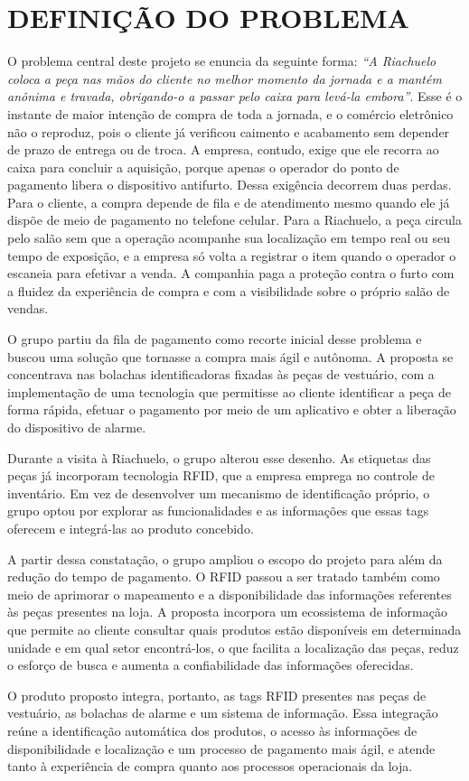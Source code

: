 
\section{DEFINIÇÃO DO PROBLEMA}
\label{sec:def_problema}

O problema central deste projeto se enuncia da seguinte forma: \emph{``A Riachuelo coloca a peça nas mãos do cliente no melhor momento da jornada e a mantém anônima e travada, obrigando-o a passar pelo caixa para levá-la embora''}. Esse é o instante de maior intenção de compra de toda a jornada, e o comércio eletrônico não o reproduz, pois o cliente já verificou caimento e acabamento sem depender de prazo de entrega ou de troca. A empresa, contudo, exige que ele recorra ao caixa para concluir a aquisição, porque apenas o operador do ponto de pagamento libera o dispositivo antifurto. Dessa exigência decorrem duas perdas. Para o cliente, a compra depende de fila e de atendimento mesmo quando ele já dispõe de meio de pagamento no telefone celular. Para a Riachuelo, a peça circula pelo salão sem que a operação acompanhe sua localização em tempo real ou seu tempo de exposição, e a empresa só volta a registrar o item quando o operador o escaneia para efetivar a venda. A companhia paga a proteção contra o furto com a fluidez da experiência de compra e com a visibilidade sobre o próprio salão de vendas.

O grupo partiu da fila de pagamento como recorte inicial desse problema e buscou uma solução que tornasse a compra mais ágil e autônoma. A proposta se concentrava nas bolachas identificadoras fixadas às peças de vestuário, com a implementação de uma tecnologia que permitisse ao cliente identificar a peça de forma rápida, efetuar o pagamento por meio de um aplicativo e obter a liberação do dispositivo de alarme.

Durante a visita à Riachuelo, o grupo alterou esse desenho. As etiquetas das peças já incorporam tecnologia RFID, que a empresa emprega no controle de inventário. Em vez de desenvolver um mecanismo de identificação próprio, o grupo optou por explorar as funcionalidades e as informações que essas tags oferecem e integrá-las ao produto concebido.

A partir dessa constatação, o grupo ampliou o escopo do projeto para além da redução do tempo de pagamento. O RFID passou a ser tratado também como meio de aprimorar o mapeamento e a disponibilidade das informações referentes às peças presentes na loja. A proposta incorpora um ecossistema de informação que permite ao cliente consultar quais produtos estão disponíveis em determinada unidade e em qual setor encontrá-los, o que facilita a localização das peças, reduz o esforço de busca e aumenta a confiabilidade das informações oferecidas.

O produto proposto integra, portanto, as tags RFID presentes nas peças de vestuário, as bolachas de alarme e um sistema de informação. Essa integração reúne a identificação automática dos produtos, o acesso às informações de disponibilidade e localização e um processo de pagamento mais ágil, e atende tanto à experiência de compra quanto aos processos operacionais da loja.